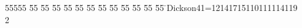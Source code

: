 %
%
\begin{tabbing}
55555 \= 55 \= 55 \= 55 \= 55 \= 55 \= 55 \= 55 \= 55 \= 55 \= 55 \= 55 \= 55 \= \>Dickson41=12141715110111114119\\[0pt]
2\>\end{tabbing}

